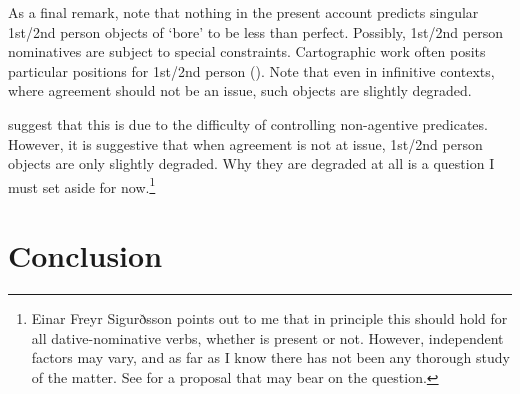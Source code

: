 \documentclass[output=paper]{langscibook}
\def\exattr#1{\hfill{} #1}
\begin{document}
As a final remark, note that nothing in the present account  predicts  singular 1st/2nd person objects of  `bore' to be less than perfect. Possibly, 1st/2nd person nominatives  are subject to special constraints. Cartographic work often  posits particular positions  for 1st/2nd person (\citealt{Savescu:2009al}). Note that even in infinitive contexts, where agreement should not be an issue, such objects are slightly degraded.


\z

\citet[271]{SigurTHsson:2008dm} suggest that this is due to the difficulty of controlling non-agentive predicates. However, it is suggestive that when agreement is not at issue, 1st/2nd person objects are only slightly degraded. Why they are degraded at all is a question I must set aside for now.\footnote{Einar Freyr Sigurðsson points out to me that in principle this should hold for all dative-nominative verbs, whether  is present or not. However, independent factors may vary, and as far as I know there has not been any thorough study of the matter. See \citet{SigEPP} for a proposal that may bear on the question.} 


\section{Conclusion}
\end{document}
